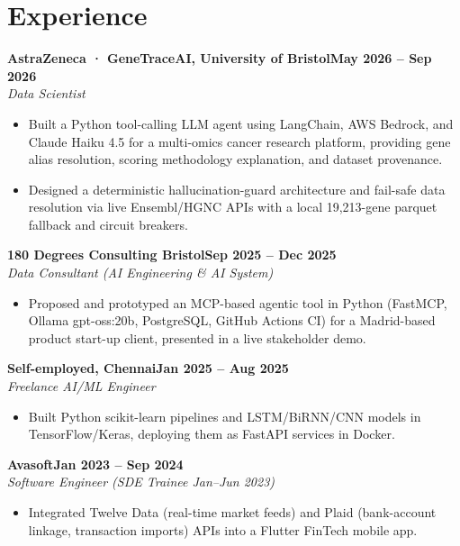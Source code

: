 \documentclass[a4paper,10pt]{article}
\newcommand{\entry}[4]{\noindent\textbf{#1}\hfill\textbf{#2}\\ \textit{#3}\hfill\textit{#4}\par}
\begin{document}
\section{Experience}
\entry{AstraZeneca · GeneTraceAI, University of Bristol}{May 2026 – Sep 2026}{Data Scientist}{}
\begin{itemize}
  \item Built a Python tool-calling LLM agent using LangChain, AWS Bedrock, and Claude Haiku 4.5 for a multi-omics cancer research platform, providing gene alias resolution, scoring methodology explanation, and dataset provenance.
  \item Designed a deterministic hallucination-guard architecture and fail-safe data resolution via live Ensembl/HGNC APIs with a local 19,213-gene parquet fallback and circuit breakers.
\end{itemize}
\vspace{3pt}
\entry{180 Degrees Consulting Bristol}{Sep 2025 – Dec 2025}{Data Consultant (AI Engineering \& AI System)}{}
\begin{itemize}
  \item Proposed and prototyped an MCP-based agentic tool in Python (FastMCP, Ollama gpt-oss:20b, PostgreSQL, GitHub Actions CI) for a Madrid-based product start-up client, presented in a live stakeholder demo.
\end{itemize}
\vspace{3pt}
\entry{Self-employed, Chennai}{Jan 2025 – Aug 2025}{Freelance AI/ML Engineer}{}
\begin{itemize}
  \item Built Python scikit-learn pipelines and LSTM/BiRNN/CNN models in TensorFlow/Keras, deploying them as FastAPI services in Docker.
\end{itemize}
\vspace{3pt}
\entry{Avasoft}{Jan 2023 – Sep 2024}{Software Engineer (SDE Trainee Jan–Jun 2023)}{}
\begin{itemize}
  \item Integrated Twelve Data (real-time market feeds) and Plaid (bank-account linkage, transaction imports) APIs into a Flutter FinTech mobile app.
\end{itemize}

\end{document}
